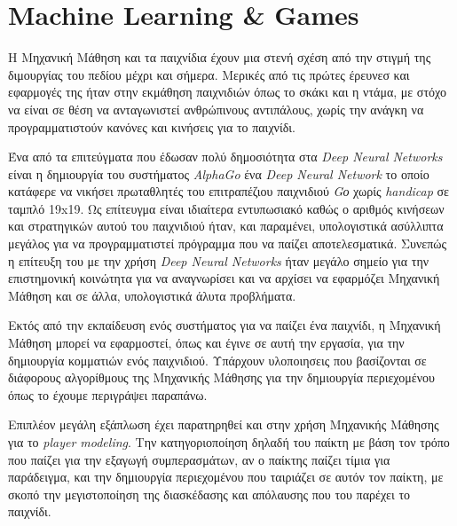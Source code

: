 \section{Machine Learning \& Games}
Η Μηχανική Μάθηση και τα παιχνίδια έχουν μια στενή σχέση από την στιγμή της διμουργίας του πεδίου μέχρι και σήμερα. Μερικές από τις πρώτες έρευνεσ και εφαρμογές της ήταν στην εκμάθηση παιχνιδιών όπως το σκάκι και η ντάμα, με στόχο να είναι σε θέση να ανταγωνιστεί ανθρώπινους αντιπάλους, χωρίς την ανάγκη να προγραμματιστούν κανόνες και κινήσεις για το παιχνίδι. 
\par
Ένα από τα επιτεύγματα που έδωσαν πολύ δημοσιότητα στα \textit{Deep Neural Networks} είναι η δημιουργία του συστήματος \textit{AlphaGo} ένα \textit{Deep Neural Network} το οποίο κατάφερε να νικήσει πρωταθλητές του επιτραπέζιου παιχνιδιού \textit{Gο} χωρίς \textit{handicap} σε ταμπλό 19x19. Ως επίτευγμα είναι ιδιαίτερα εντυπωσιακό καθώς ο αριθμός κινήσεων και στρατηγικών αυτού του παιχνιδιού ήταν, και παραμένει, υπολογιστικά ασύλλιπτα μεγάλος για να προγραμματιστεί πρόγραμμα που να παίζει αποτελεσματικά. Συνεπώς η επίτευξη του με την χρήση \textit{Deep Neural Networks} ήταν μεγάλο σημείο για την επιστημονική κοινώτητα για να αναγνωρίσει και να αρχίσει να εφαρμόζει Μηχανική Μάθηση και σε άλλα, υπολογιστικά άλυτα προβλήματα.
\par
Εκτός από την εκπαίδευση ενός συστήματος για να παίζει ένα παιχνίδι, η Μηχανική Μάθηση μπορεί να εφαρμοστεί, όπως και έγινε σε αυτή την εργασία, για την δημιουργία κομματιών ενός παιχνιδιού. Υπάρχουν υλοποιησεις που βασίζονται σε διάφορους αλγορίθμους της Μηχανικής Μάθησης για την δημιουργία περιεχομένου όπως το έχουμε περιγράψει παραπάνω.
\par
Επιπλέον μεγάλη εξάπλωση έχει παρατηρηθεί και στην χρήση Μηχανικής Μάθησης για το \textit{player modeling}. Την κατηγοριοποίηση δηλαδή του παίκτη με βάση τον τρόπο που παίζει για την εξαγωγή συμπερασμάτων, αν ο παίκτης παίζει τίμια για παράδειγμα, και την δημιουργία περιεχομένου που ταιριάζει σε αυτόν τον παίκτη, με σκοπό την μεγιστοποίηση της διασκέδασης και απόλαυσης που του παρέχει το παιχνίδι.


